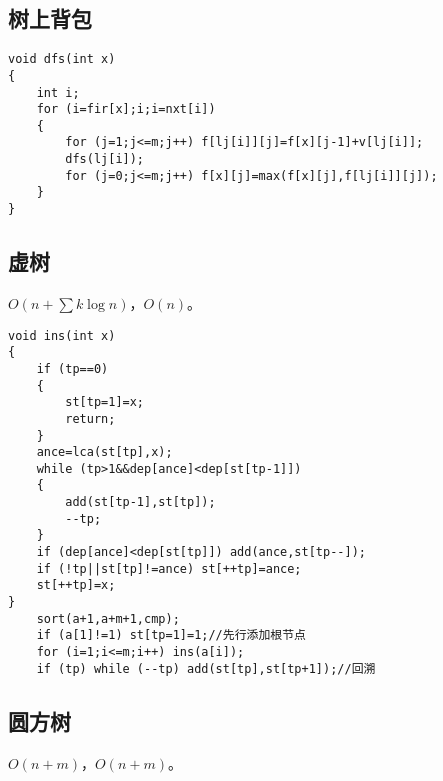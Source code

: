 \documentclass{ctexart}
\begin{document}
\subsection{树上背包}

\begin{lstlisting}
void dfs(int x)
{
	int i;
	for (i=fir[x];i;i=nxt[i])
	{
		for (j=1;j<=m;j++) f[lj[i]][j]=f[x][j-1]+v[lj[i]];
		dfs(lj[i]);
		for (j=0;j<=m;j++) f[x][j]=max(f[x][j],f[lj[i]][j]);
	}
}
\end{lstlisting}

\subsection{虚树}

$O(n+\sum k\log n)$，$O(n)$。

\begin{lstlisting}
void ins(int x)
{
	if (tp==0)
	{
		st[tp=1]=x;
		return;
	}
	ance=lca(st[tp],x);
	while (tp>1&&dep[ance]<dep[st[tp-1]])
	{
		add(st[tp-1],st[tp]);
		--tp;
	}
	if (dep[ance]<dep[st[tp]]) add(ance,st[tp--]);
	if (!tp||st[tp]!=ance) st[++tp]=ance;
	st[++tp]=x;
}
	sort(a+1,a+m+1,cmp);
	if (a[1]!=1) st[tp=1]=1;//先行添加根节点
    for (i=1;i<=m;i++) ins(a[i]);
    if (tp) while (--tp) add(st[tp],st[tp+1]);//回溯
\end{lstlisting}

\subsection{圆方树}

$O(n+m)$，$O(n+m)$。
\end{document}
